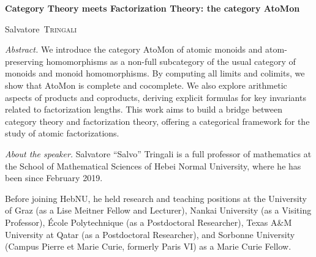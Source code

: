 \documentclass[a4paper,10pt]{amsart}
\begin{document}
              

                           
	
		
	\thispagestyle{empty}    
	
	
	\begin{center}
		\textbf{\Large{Category Theory meets Factorization Theory: the category \textsf{AtoMon}}}
	\end{center}
	\vskip 0.2cm
	
	
	
	

\begin{center}
	Salvatore~\textsc{Tringali} %
\end{center}
\vskip 0.8cm
	
	
	
	

\textit{Abstract.} We introduce the category \textsf{AtoMon} of atomic monoids and atom-preserving homomorphisms as a non-full subcategory of the usual category of monoids and monoid homomorphisms. By computing all limits and colimits, we show that \textsf{AtoMon} is complete and cocomplete. We also explore arithmetic aspects of products and coproducts, deriving explicit formulas for key invariants related to factorization lengths. This work aims to build a bridge between category theory and factorization theory, offering a categorical framework for the study of atomic factorizations.
	
\vskip 0.5cm
\textit{About the speaker.} %
Salvatore ``Salvo'' Tringali is a full professor of mathematics at the School of Mathematical Sciences of Hebei Normal University, where he has been since February 2019.

Before joining HebNU, he held research and teaching positions at the University of Graz (as a Lise Meitner Fellow and Lecturer), Nankai University (as a Visiting Professor), \'Ecole Polytechnique (as a Postdoctoral Researcher), Texas A\&M University at Qatar (as a Postdoctoral Researcher), and Sorbonne University (Campus Pierre et Marie Curie, formerly Paris VI) as a Marie Curie Fellow.
\end{document}
